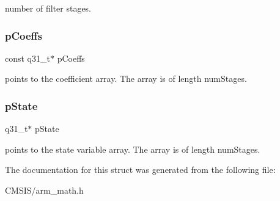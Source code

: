 number of filter stages. \mbox{\label{structarm__fir__lattice__instance__q31_a80e7fdf4747dbda8eadb2663fb4be317}} 
\subsubsection{\texorpdfstring{pCoeffs}{pCoeffs}}
{\footnotesize\ttfamily const q31\+\_\+t$\ast$ p\+Coeffs}

points to the coefficient array. The array is of length num\+Stages. \mbox{\label{structarm__fir__lattice__instance__q31_adee4ba3ee8869865af7d8fa08ca913d6}} 
\subsubsection{\texorpdfstring{pState}{pState}}
{\footnotesize\ttfamily q31\+\_\+t$\ast$ p\+State}

points to the state variable array. The array is of length num\+Stages. 

The documentation for this struct was generated from the following file\+:\begin{DoxyCompactItemize}
\item 
C\+M\+S\+I\+S/arm\+\_\+math.\+h\end{DoxyCompactItemize}
